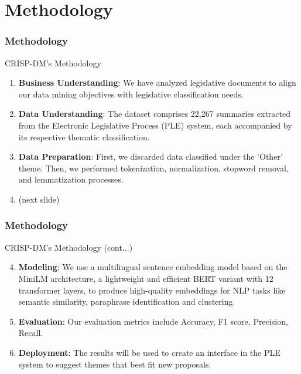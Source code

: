 \section{Methodology}
\begin{frame}
	\frametitle{Methodology}
	\begin{block}{CRISP-DM's Methodology} %
		\begin{enumerate}
			\item \textbf{Business Understanding}: We have analyzed legislative documents to align our data mining objectives with legislative classification needs.
			
			\item \textbf{Data Understanding}: The dataset comprises 22,267 summaries extracted from the Electronic Legislative Process (PLE) system, each accompanied by its respective thematic classification.
			
			\item \textbf{Data Preparation}: First, we discarded data classified under the 'Other' theme. Then, we performed tokenization, normalization, stopword removal, and lemmatization processes.
			
			\item (next slide)
		\end{enumerate}
	\end{block}
\end{frame}
\begin{frame}
	\frametitle{Methodology}
	\begin{block}{CRISP-DM's Methodology (cont...)} %
		\begin{enumerate}
			\setcounter{enumi}{3}
		
			\item \textbf{Modeling}: We use a multilingual sentence embedding model based on the MiniLM architecture, a lightweight and efficient BERT variant with 12 transformer layers, to produce high-quality embeddings for NLP tasks like semantic similarity, paraphrase identification and clustering.
			
			\item \textbf{Evaluation}: Our evaluation metrics include Accuracy, F1 score, Precision, Recall.	
			
			\item \textbf{Deployment}: The results will be used to create an interface in the PLE system to suggest themes that best fit new proposals.			
		\end{enumerate}
	\end{block}
\end{frame}
